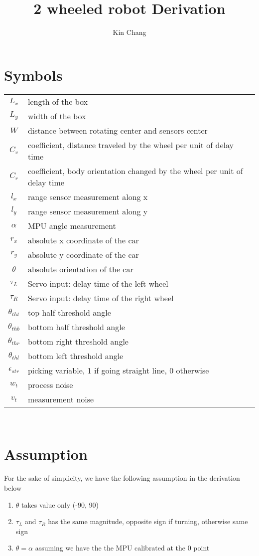 \documentclass[12pt, letterpaper]{amsart} %
\author{Kin Chang}
\title{2 wheeled robot Derivation}
\numberwithin{equation}{section}
\begin{document}
\maketitle
\section{Symbols}
\begin{tabular}{cp{}}
  $L_x$ & length of the box  \\
  $L_y$ & width of the box \\
  $W$ & distance between rotating center and sensors center \\
  $C_v$ & coefficient, distance traveled by the wheel per unit of delay time \\
  $C_r$ & coefficient, body orientation changed by the wheel per unit of delay time \\
  $l_x$ & range sensor measurement along x \\
  $l_y$ & range sensor measurement along y \\
  $\alpha$ & MPU angle measurement \\
  $r_x$ & absolute x coordinate of the car \\
  $r_y$ & absolute y coordinate of the car \\
  $\theta$ & absolute orientation of the car \\
  $\tau_L$ & Servo input: delay time of the left wheel \\
  $\tau_R$ & Servo input: delay time of the right wheel \\
  $\theta_{tht}$ & top half threshold angle \\
  $\theta_{thb}$ & bottom half threshold angle \\
  $\theta_{thr}$ & bottom right threshold angle \\
  $\theta_{thl}$ & bottom left threshold angle \\
  $\epsilon_{str}$ & picking variable, 1 if going straight line, 0 otherwise \\
  $w_t$ & process noise \\
  $v_t$ & measurement noise
\end{tabular}\\
\section{Assumption}
For the sake of simplicity, we have the following assumption in the derivation below
\begin{enumerate}
\item $\theta$ takes value only (-90, 90)
\item $\tau_L$ and $\tau_R$ has the same magnitude, opposite sign if turning, otherwise same sign 
\item $\theta = \alpha$ assuming we have the the MPU calibrated at the 0 point
\end{enumerate}  
\end{document}
